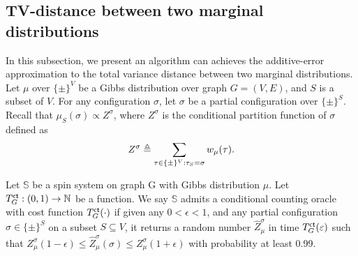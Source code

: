 

   


\subsection{TV-distance between two marginal distributions}

In this subsection, we present an algorithm can achieves the additive-error approximation to the total variance distance between two marginal distributions. Let $\mu$ over $\{\pm\}^V$ be a Gibbs distribution over graph $G=(V,E)$, and $S$ is a subset of $V$. For any configuration $\sigma$, let $\sigma$ be a partial configuration over $\{\pm\}^S$. Recall that $\mu_S(\sigma)  \propto Z^{\sigma}$, where $Z^{\sigma}$ is the conditional partition function of $\sigma$ defined as
\begin{align*}
    Z^{\sigma}\triangleq\sum_{\tau \in \{\pm\}^V: \tau_S = \sigma } w_\mu(\tau).
\end{align*}


\begin{definition}\label{def:cond-count-oracle}
Let $\mathbb{S}$ be a spin system on graph G with Gibbs distribution $\mu$. 
Let $T^{\textsf{ct}}_{G}:(0,1) \to \mathbb{N}$ be a function.
We say $\mathbb{S}$ admits a conditional counting oracle with cost function $T^{\textsf{ct}}_{G}(\cdot)$ if given any $0<\epsilon<1$, and any partial configuration $\sigma \in \{\pm\}^S$ on a subset $S\subseteq V$, it returns a random number $\hat{Z}_\mu^{\sigma}$ in time $T^{\textsf{ct}}_{G}(\varepsilon)$ such that $Z_\mu^{\sigma}(1-\epsilon)\leq \hat{Z}_\mu^{\sigma}(\sigma) \leq Z_\mu^{\sigma}(1+\epsilon)$ with probability at least 0.99.
\end{definition}

